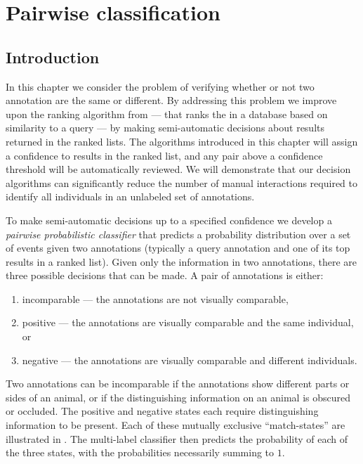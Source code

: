 \chapter{Pairwise classification}\label{chap:pairclf}

\section{Introduction}\label{sec:clf_intro}

In this chapter we consider the problem of verifying whether or not two
  annotation are the same or different.
By addressing this problem we improve upon the ranking algorithm from
   --- that ranks the \names{} in a database based on
  similarity to a query --- by making semi-automatic decisions about results
  returned in the ranked lists.
The algorithms introduced in this chapter will assign a confidence to results
  in the ranked list, and any pair above a confidence threshold will be
  automatically reviewed.
We will demonstrate that our decision algorithms can significantly reduce the
  number of manual interactions required to identify all individuals in an
  unlabeled set of annotations.

To make semi-automatic decisions up to a specified confidence we develop a
  \emph{pairwise probabilistic classifier} that predicts a probability
  distribution over a set of events given two annotations (typically a query
  annotation and one of its top results in a ranked list).
Given only the information in two annotations,  there are three possible
  decisions that can be made.
A pair of annotations is either:
\begin{enumerate}
    \item incomparable --- the annotations are not visually comparable,

    \item positive --- the annotations are visually comparable and the
      same individual, or

    \item negative --- the annotations are visually comparable and different
      individuals.
\end{enumerate}
Two annotations can be incomparable if the annotations show different parts or
  sides of an animal, or if the distinguishing information on an animal is
  obscured or occluded.
The positive and negative states each require distinguishing information to be
  present.
Each of these mutually exclusive ``match-states'' are illustrated in
  .
The multi-label classifier then predicts the probability of each of the three
  states, with the probabilities necessarily summing to $1$.

